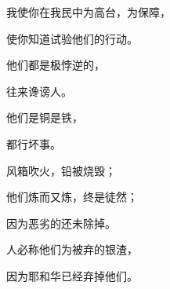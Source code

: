 {\par }{\BB \par }{\Q {}我使你在我民中为高台，为保障，
\par }{\Q 使你知道试验他们的行动。
\par }{\Q {}他们都是极悖逆的，
\par }{\Q 往来谗谤人。
\par }{\Q 他们是铜是铁，
\par }{\Q 都行坏事。
\par }{\Q {}风箱吹火，铅被烧毁；
\par }{\Q 他们炼而又炼，终是徒然；
\par }{\Q 因为恶劣的还未除掉。
\par }{\Q {}人必称他们为被弃的银渣，
\par }{\Q 因为耶和华已经弃掉他们。

}
